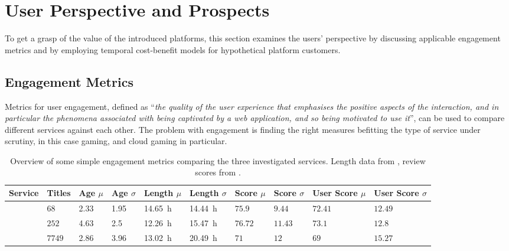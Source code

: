 \section{User Perspective and Prospects}
\label{sec:engagement}

To get a grasp of the value of the introduced platforms, this section examines the users' perspective by discussing applicable engagement metrics and by employing temporal cost-benefit models for hypothetical platform customers.



\subsection{Engagement Metrics}

Metrics for user engagement, defined as ``\textit{the quality of the user experience that emphasises the positive aspects of the interaction, and in particular the phenomena associated with being captivated by a web application, and so being motivated to use it}''\cite{Lehmann2012}, can be used to compare different services against each other. The problem with engagement is finding the right measures befitting the type of service under scrutiny, in this case gaming, and cloud gaming in particular.

\begin{table}
\centering
\caption{Overview of some simple engagement metrics comparing the three investigated services. Length data from \hltb, review scores from \metacritic.}
\label{tab:basic-engagement}
	\begin{tabu}{X[2]|X[r]X[r]X[r]X[r]X[r]X[r]X[r]X[r]X[r]}
	\toprule
	Service & Titles & Age $\mu$ & Age $\sigma$ & Length $\mu$ & Length $\sigma$ & Score $\mu$ & Score $\sigma$ & User Score $\mu$ & User Score $\sigma$\\
	\midrule
	\gfnow & $68$ & \SI{2.33}{\year} & \SI{1.95}{\year} & \SI{14.65}{\hour} & \SI{14.44}{\hour} & $75.9$ & $9.44$ & $72.41$ & $12.49$\\
	\psnow & $252$ & \SI{4.63}{\year} & \SI{2.5}{\year} & \SI{12.26}{\hour} & \SI{15.47}{\hour} & $76.72$ & $11.43$ & $73.1$ & $12.8$\\
	\steam & $7749$ & \SI{2.86}{\year} & \SI{3.96}{\year} & \SI{13.02}{\hour} & \SI{20.49}{\hour} & $71$ & $12$ & $69$ & $15.27$\\
	\bottomrule
	\end{tabu}
\end{table}

